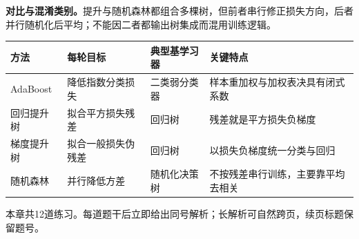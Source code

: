 \begin{comparisonbox}
\textbf{对比与混淆类别。}提升与随机森林都组合多棵树，但前者串行修正损失方向，后者并行随机化后平均；不能因二者都输出树集成而混用训练逻辑。\par\smallskip
\begin{tabularx}{\linewidth}{@{}l X X X@{}}
\toprule 方法 & 每轮目标 & 典型基学习器 & 关键特点\\ \midrule
AdaBoost & 降低指数分类损失 & 二类弱分类器 & 样本重加权与加权表决具有闭式系数\\
回归提升树 & 拟合平方损失残差 & 回归树 & 残差就是平方损失负梯度\\
梯度提升树 & 拟合一般损失伪残差 & 回归树 & 以损失负梯度统一分类与回归\\
随机森林 & 并行降低方差 & 随机化决策树 & 不按残差串行训练，主要靠平均去相关\\
\bottomrule
\end{tabularx}
\end{comparisonbox}

\label{struct:V3-C03-CH34}
\begin{chapterexercisebox}
\label{struct:V3-C03-CH35}
本章共12道练习。每道题干后立即给出同号解析；长解析可自然跨页，续页标题保留题号。
\end{chapterexercisebox}


